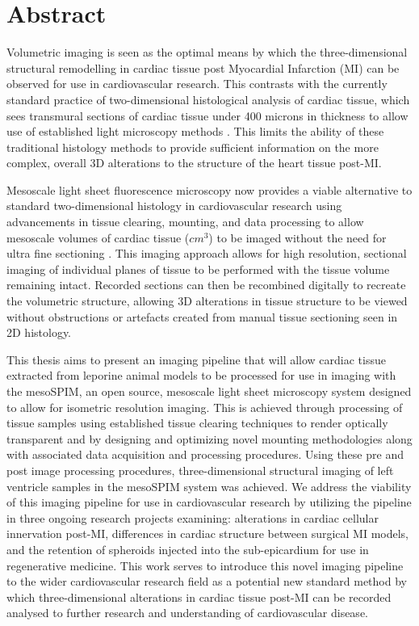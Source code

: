 \chapter{Abstract}
Volumetric imaging is seen as the optimal means by which the three-dimensional structural remodelling in cardiac tissue post Myocardial Infarction (MI) can be observed for use in cardiovascular research.  This contrasts with the currently standard practice of two-dimensional histological analysis of cardiac tissue, which sees transmural sections of cardiac tissue under 400 microns in thickness to allow use of established light microscopy methods \cite{casero_transformation_2017}. This limits the ability of these traditional histology methods to provide sufficient information on the more complex, overall 3D alterations to the structure of the heart tissue post-MI.
 
Mesoscale light sheet fluorescence microscopy now provides a viable alternative to standard two-dimensional histology in cardiovascular research using advancements in tissue clearing, mounting, and data processing to allow mesoscale volumes of cardiac tissue ($cm^3$) to be imaged without the need for ultra fine sectioning \cite{voigt_mesospim_2019}. This imaging approach allows for high resolution, sectional imaging of individual planes of tissue to be performed with the tissue volume remaining intact. Recorded sections can then be recombined digitally to recreate the volumetric structure, allowing 3D alterations in tissue structure to be viewed without obstructions or artefacts created from manual tissue sectioning seen in 2D histology. 

This thesis aims to present an imaging pipeline that will allow cardiac tissue extracted from leporine animal models to be processed for use in imaging with the mesoSPIM, an open source, mesoscale light sheet microscopy system designed to allow for isometric resolution imaging. This is achieved through processing of tissue samples using established tissue clearing techniques to render optically transparent and by designing and optimizing novel mounting methodologies along with associated data acquisition and processing procedures. Using these pre and post image processing procedures, three-dimensional structural imaging of left ventricle samples in the mesoSPIM system was achieved. We address the viability of this imaging pipeline for use in cardiovascular research by utilizing the pipeline in three ongoing research projects examining: alterations in cardiac cellular innervation post-MI, differences in cardiac structure between surgical MI models, and the retention of spheroids injected into the sub-epicardium for use in regenerative medicine. This work serves to introduce this novel imaging pipeline to the wider cardiovascular research field as a potential new standard method by which three-dimensional alterations in cardiac tissue post-MI can be recorded analysed to further research and understanding of cardiovascular disease.

